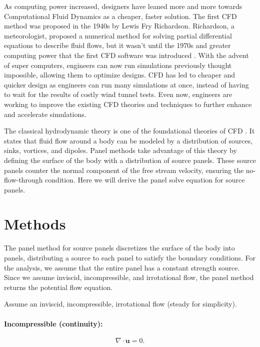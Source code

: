 \documentclass[conf]{new-aiaa} %
\begin{document}
As computing power increased, designers have leaned more and more towards Computational Fluid Dynamics as a cheaper, faster solution.
The first CFD method was proposed in the 1940s by Lewis Fry Richardson. 
Richardson, a meteorologist, proposed a numerical method for solving partial differential equations to describe fluid flows, but it wasn't until the 1970s and greater computing power that the first CFD software was introduced \cite{resolved_cfd_history}.
With the advent of super computers, engineers can now run simulations previously thought impossible, allowing them to optimize designs.
CFD has led to cheaper and quicker design as engineers can run many simulations at once, instead of having to wait for the results of costly wind tunnel tests.
Even now, engineers are working to improve the existing CFD theories and techniques to further enhance and accelerate simulations.

The classical hydrodynamic theory is one of the foundational theories of CFD \cite{sciencedirect_vortex}. 
It states that fluid flow around a body can be modeled by a distribution of sources, sinks, vortices, and dipoles.
Panel methods take advantage of this theory by defining the surface of the body with a distribution of source panels.
These source panels counter the normal component of the free stream velocity, ensuring the no-flow-through condition.
Here we will derive the panel solve equation for source panels.

\section{Methods}
The panel method for source panels discretizes the surface of the body into panels, distributing a source to each panel to satisfy the boundary conditions.
For the analysis, we assume that the entire panel has a constant strength source.
Since we assume inviscid, incompressible, and irrotational flow, the panel method returns the potential flow equation.

Assume an inviscid, incompressible, irrotational flow (steady for simplicity).

\paragraph{Incompressible (continuity):}
\begin{equation}
\nabla \cdot \mathbf{u} = 0.
\label{eq:continuity}
\end{equation}
\end{document}
